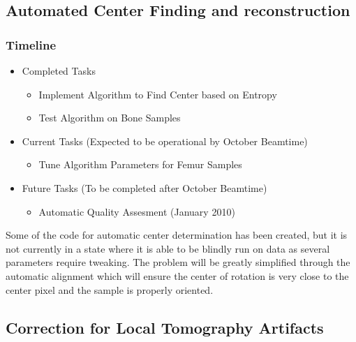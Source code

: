 \subsection{Automated Center Finding and reconstruction}
\subsubsection*{Timeline}
\begin{itemize}
 	\item Completed Tasks
	\begin{itemize}
		\item Implement Algorithm to Find Center based on Entropy
		\item Test Algorithm on Bone Samples
	\end{itemize}
	\item Current Tasks (Expected to be operational by October Beamtime)
	\begin{itemize}
		\item Tune Algorithm Parameters for Femur Samples
	\end{itemize}
	\item Future Tasks (To be completed after October Beamtime)
	\begin{itemize}
		\item Automatic Quality Assesment (January 2010)
	\end{itemize}
\end{itemize}

Some of the code for automatic center determination has been created, but it is not currently in a state where it is able to be blindly run on data as several parameters require tweaking. The problem will be greatly simplified through the automatic alignment which will  ensure the center of rotation is very close to the center pixel and the sample is properly oriented.

\subsection{Correction for Local Tomography Artifacts}
